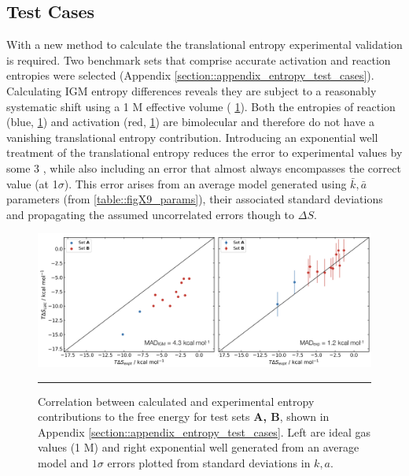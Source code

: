 \documentclass[../main.tex]{subfiles}
\begin{document}
\subsection{Test Cases}

With a new method to calculate the translational entropy experimental validation is required. Two benchmark sets that comprise accurate activation and reaction entropies were selected (Appendix \ref{section::appendix_entropy_test_cases}). Calculating IGM entropy differences reveals they are subject to a reasonably systematic shift using a 1 M effective volume (\figurename{ \ref{fig::entropy_X10}}). Both the entropies of reaction (blue, \figurename{ \ref{fig::entropy_X10}}) and activation (red, \figurename{ \ref{fig::entropy_X10}}) are bimolecular and therefore do not have a vanishing translational entropy contribution. Introducing an exponential well treatment of the translational entropy reduces the error to experimental values by some 3 \kcal, while also including an error that almost always encompasses the correct value (at 1$\sigma$). This error arises from an average model generated using $\bar{k}, \bar{a}$ parameters (from \tablename{ \ref{table::figX9_params}}), their associated standard deviations and propagating the assumed uncorrelated errors though to $\Delta S$. 

\vspace{0.3cm}
\begin{figure}[h!]
	\includegraphics[width=\textwidth]{4/figs/figX10/figX10}
	\vspace{0.2cm}
	\hrule
	\caption{Correlation between calculated and experimental entropy contributions to the free energy for test sets {\bfseries{A, B}}, shown in Appendix \ref{section::appendix_entropy_test_cases}. Left are ideal gas values (1 M) and right exponential well generated from an average model and $1\sigma$ errors plotted from standard deviations in $k, a$.} 
	\label{fig::entropy_X10}
\end{figure}
\end{document}
